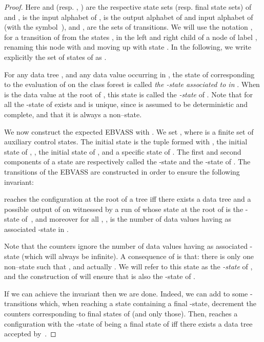 \documentclass{CSML}
\newcommand\ebvass{\textup{EBVASS}\xspace}
\newcommand\rootstate{-state\xspace}
\begin{document}
\begin{proof}
Here  and  (resp. , ) are the respective state sets
(resp. final state sets) of  and , 
 is the input alphabet of , 
 is the output alphabet of  and input alphabet of 
(with the symbol~),
and ,  are the sets of transitions.
We will use the notation  
,
for a transition of  from the states ,  in the left and right child 
of a node of label , renaming this node with  and moving up with state .
In the following, we write explicitly the set of states of  
as .

For any data tree , and any data value  occurring in , 
the state of  corresponding to the evaluation of  on the class forest 
is called \emph{the -state associated to  in }. 
When  is the data value at the root of ,
this state is called the \emph{\rootstate{}} of .
Note that for all  the \rootstate{} of  exists and is unique,
since  is assumed to be deterministic and complete, 
and that it is always a non--state.

We now construct the expected \ebvass  
with .
We set , 
where  is a finite set of auxiliary control states.
The initial state  is the tuple formed with , the initial state of ,
, the initial state of , and a specific state of .
The first and second components of a state 
are respectively called the -state and the 
\rootstate of .
The transitions of the \ebvass  are constructed in order to ensure
the following invariant:

\medskip
\noindent
\hspace{-1mm}\hspace{2mm}\parbox[t]{128mm}{ reaches the configuration  at the
  root of a tree  
  iff there exists a data tree 
  and a possible output  of  on  
  witnessed by a run of  whose state at the root of  is the -state of~,   
  and moreover for all , ,
   is the number of data values having  as associated -state 
  in .}  
\medskip

\noindent Note that the counters ignore the number of data values having  as associated -state 
(which will always be infinite).
A consequence of  is that:
 there is only one non--state  such that , and actually .
We will refer to this state  as the \emph{\rootstate} of ,
and the construction of  will ensure that  is also the \rootstate of .


If we can achieve the invariant  then we are done.
Indeed, we can add to  some -transitions which, 
when reaching a state  containing a final -state,
decrement the counters corresponding to final states of  (and only those).
Then,  reaches a configuration  with the -state of  being
a final state of  iff there exists a data tree accepted by~.



\end{proof}
\end{document}
